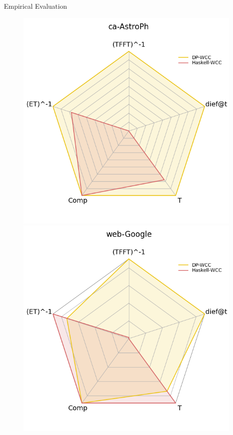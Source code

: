 \documentclass{beamer}
\begin{document}
\begin{frame}[fragile]{Empirical Evaluation}
\begin{figure}[!htb]
      \begin{minipage}{0.33\textwidth}
       \includegraphics[width=1\linewidth, height=0.35\textheight]{ca_astroph_radar}
      \end{minipage}%
      \begin{minipage}{0.33\textwidth}
       \includegraphics[width=1\linewidth, height=0.35\textheight]{web_google_radar}
      \end{minipage}
  \end{figure}
  \end{frame}
\end{document}
